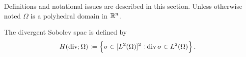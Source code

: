 \documentclass[thesis.tex]{subfiles}
\begin{document}
Definitions and notational issues are described in this section. Unless otherwise noted $\Omega$ is a polyhedral domain in $\mathbb{R}^n$.
\begin{defn}
The divergent Sobolev spac is defined by
\[
  H(\operatorname{div}; \Omega) := \set{ \sigma \in [L^2(\Omega)]^2 : \operatorname{div}\sigma \in L^2(\Omega)}.
  \]
\end{defn}
\end{document}
